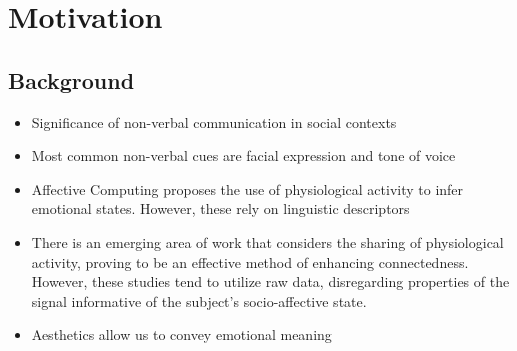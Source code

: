 \newcommand{\novathesis}{\emph{novathesis}}
\newcommand{\novathesisclass}{\texttt{novathesis.cls}}


\chapter{Motivation}
\label{cha:introduction}






\section{Background}
\label{sec:objectives}

\begin{itemize}
  \item Significance of non-verbal communication in social contexts
  \item Most common non-verbal cues are facial expression and tone of voice
  \item Affective Computing proposes the use of physiological activity to infer emotional states. However, these rely on linguistic descriptors
  \item There is an emerging area of work that considers the sharing of physiological activity, proving to be an effective method of enhancing connectedness. However, these studies tend to utilize raw data, disregarding  properties of the signal informative of the subject's socio-affective state.
  \item Aesthetics allow us to convey emotional meaning
\end{itemize}

